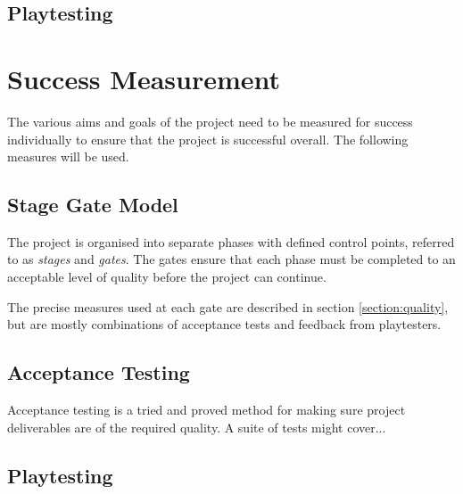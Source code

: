 \subsection{Playtesting}



\section{Success Measurement}
\label{section:success}

The various aims and goals of the project need to be measured for success individually to ensure that the project is successful overall. The following measures will be used.

\subsection{Stage Gate Model}

The project is organised into separate phases with defined control points, referred to as \emph{stages} and \emph{gates}. The gates ensure that each phase must be completed to an acceptable level of quality before the project can continue.

The precise measures used at each gate are described in section \ref{section:quality}, but are mostly combinations of acceptance tests and feedback from playtesters.

\subsection{Acceptance Testing}

Acceptance testing is a tried and proved method for making sure project deliverables are of the required quality. A suite of tests might cover...

\subsection{Playtesting}

